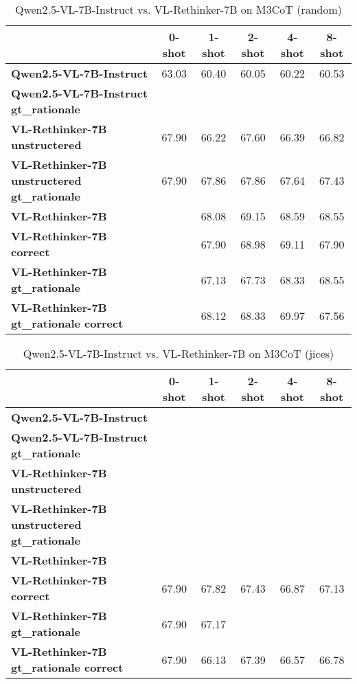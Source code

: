 \begin{table}
\caption{Qwen2.5-VL-7B-Instruct vs. VL-Rethinker-7B on M3CoT (random)}
\label{tab:Qwen2.5-VL-7B-Instruct_M3CoT_TRAIN_random}
\begin{tabular}{lccccc}
\toprule
 & 0-shot & 1-shot & 2-shot & 4-shot & 8-shot \\
\midrule
\textbf{Qwen2.5-VL-7B-Instruct} & 63.03 & 60.40 & 60.05 & 60.22 & 60.53 \\
\textbf{Qwen2.5-VL-7B-Instruct gt\_rationale} &  &  &  &  &  \\
\textbf{VL-Rethinker-7B unstructered} & 67.90 & 66.22 & 67.60 & 66.39 & 66.82 \\
\textbf{VL-Rethinker-7B unstructered gt\_rationale} & 67.90 & 67.86 & 67.86 & 67.64 & 67.43 \\
\textbf{VL-Rethinker-7B} &  & 68.08 & 69.15 & 68.59 & 68.55 \\
\textbf{VL-Rethinker-7B correct} &  & 67.90 & 68.98 & 69.11 & 67.90 \\
\textbf{VL-Rethinker-7B gt\_rationale} &  & 67.13 & 67.73 & 68.33 & 68.55 \\
\textbf{VL-Rethinker-7B gt\_rationale correct} &  & 68.12 & 68.33 & 69.97 & 67.56 \\
\bottomrule
\end{tabular}
\end{table}


\begin{table}
\caption{Qwen2.5-VL-7B-Instruct vs. VL-Rethinker-7B on M3CoT (jices)}
\label{tab:Qwen2.5-VL-7B-Instruct_M3CoT_TRAIN_jices}
\begin{tabular}{lccccc}
\toprule
 & 0-shot & 1-shot & 2-shot & 4-shot & 8-shot \\
\midrule
\textbf{Qwen2.5-VL-7B-Instruct} &  &  &  &  &  \\
\textbf{Qwen2.5-VL-7B-Instruct gt\_rationale} &  &  &  &  &  \\
\textbf{VL-Rethinker-7B unstructered} &  &  &  &  &  \\
\textbf{VL-Rethinker-7B unstructered gt\_rationale} &  &  &  &  &  \\
\textbf{VL-Rethinker-7B} &  &  &  &  &  \\
\textbf{VL-Rethinker-7B correct} & 67.90 & 67.82 & 67.43 & 66.87 & 67.13 \\
\textbf{VL-Rethinker-7B gt\_rationale} & 67.90 & 67.17 &  &  &  \\
\textbf{VL-Rethinker-7B gt\_rationale correct} & 67.90 & 66.13 & 67.39 & 66.57 & 66.78 \\
\bottomrule
\end{tabular}
\end{table}


